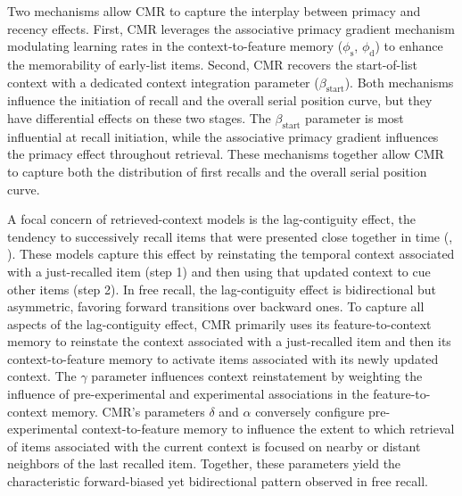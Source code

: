 \documentclass[
  man,
  floatsintext,
  longtable,
  nolmodern,
  notxfonts,
  notimes,
  draftfirst,
  colorlinks=true,linkcolor=blue,citecolor=blue,urlcolor=blue]{apa7}
\begin{document}
Two mechanisms allow CMR to capture the interplay between primacy and
recency effects. First, CMR leverages the associative primacy gradient
mechanism modulating learning rates in the context-to-feature memory
(\(\phi_\text{s}\), \(\phi_\text{d}\)) to enhance the memorability of
early-list items. Second, CMR recovers the start-of-list context with a
dedicated context integration parameter (\(\beta_\text{start}\)). Both
mechanisms influence the initiation of recall and the overall serial
position curve, but they have differential effects on these two stages.
The \(\beta_\text{start}\) parameter is most influential at recall
initiation, while the associative primacy gradient influences the
primacy effect throughout retrieval. These mechanisms together allow CMR
to capture both the distribution of first recalls and the overall serial
position curve.

A focal concern of retrieved-context models is the lag-contiguity
effect, the tendency to successively recall items that were presented
close together in time (, ). These models
capture this effect by reinstating the temporal context associated with
a just-recalled item (step 1) and then using that updated context to cue
other items (step 2). In free recall, the lag-contiguity effect is
bidirectional but asymmetric, favoring forward transitions over backward
ones. To capture all aspects of the lag-contiguity effect, CMR primarily
uses its feature-to-context memory to reinstate the context associated
with a just-recalled item and then its context-to-feature memory to
activate items associated with its newly updated context. The \(\gamma\)
parameter influences context reinstatement by weighting the influence of
pre-experimental and experimental associations in the feature-to-context
memory. CMR's parameters \(\delta\) and \(\alpha\) conversely configure
pre-experimental context-to-feature memory to influence the extent to
which retrieval of items associated with the current context is focused
on nearby or distant neighbors of the last recalled item. Together,
these parameters yield the characteristic forward-biased yet
bidirectional pattern observed in free recall.
\end{document}
